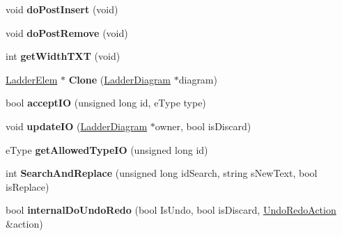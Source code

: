 \begin{DoxyCompactItemize}
\item 
\hypertarget{class_ladder_elem_set_da_a2cdac2b0eae66943a4f181cdfd1d071e}{void {\bfseries do\-Post\-Insert} (void)}\label{class_ladder_elem_set_da_a2cdac2b0eae66943a4f181cdfd1d071e}

\item 
\hypertarget{class_ladder_elem_set_da_a92a670e2f63296a68850d4c45e96f3f2}{void {\bfseries do\-Post\-Remove} (void)}\label{class_ladder_elem_set_da_a92a670e2f63296a68850d4c45e96f3f2}

\item 
\hypertarget{class_ladder_elem_set_da_a8df70b781e022743051292f1473512fa}{int {\bfseries get\-Width\-T\-X\-T} (void)}\label{class_ladder_elem_set_da_a8df70b781e022743051292f1473512fa}

\item 
\hypertarget{class_ladder_elem_set_da_ace8c2b2a872c0ee9c5ec73e04ebcd087}{\hyperlink{class_ladder_elem}{Ladder\-Elem} $\ast$ {\bfseries Clone} (\hyperlink{class_ladder_diagram}{Ladder\-Diagram} $\ast$diagram)}\label{class_ladder_elem_set_da_ace8c2b2a872c0ee9c5ec73e04ebcd087}

\item 
\hypertarget{class_ladder_elem_set_da_ad97a6da4076ce9bad529bd7eb960ba61}{bool {\bfseries accept\-I\-O} (unsigned long id, e\-Type type)}\label{class_ladder_elem_set_da_ad97a6da4076ce9bad529bd7eb960ba61}

\item 
\hypertarget{class_ladder_elem_set_da_a71306b851d353221010ea4bb6fe7e828}{void {\bfseries update\-I\-O} (\hyperlink{class_ladder_diagram}{Ladder\-Diagram} $\ast$owner, bool is\-Discard)}\label{class_ladder_elem_set_da_a71306b851d353221010ea4bb6fe7e828}

\item 
\hypertarget{class_ladder_elem_set_da_a9f6cd89915e89478dbe5fcf3da993866}{e\-Type {\bfseries get\-Allowed\-Type\-I\-O} (unsigned long id)}\label{class_ladder_elem_set_da_a9f6cd89915e89478dbe5fcf3da993866}

\item 
\hypertarget{class_ladder_elem_set_da_a801b357fe0ac15b63671520713f2ff66}{int {\bfseries Search\-And\-Replace} (unsigned long id\-Search, string s\-New\-Text, bool is\-Replace)}\label{class_ladder_elem_set_da_a801b357fe0ac15b63671520713f2ff66}

\item 
\hypertarget{class_ladder_elem_set_da_ad6b3a0c03aee6306d58962c0626162e1}{bool {\bfseries internal\-Do\-Undo\-Redo} (bool Is\-Undo, bool is\-Discard, \hyperlink{struct_undo_redo_action}{Undo\-Redo\-Action} \&action)}\label{class_ladder_elem_set_da_ad6b3a0c03aee6306d58962c0626162e1}

\end{DoxyCompactItemize}
